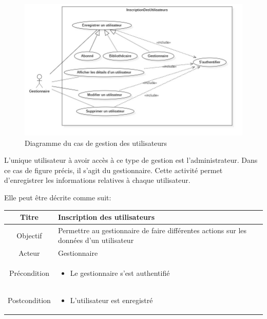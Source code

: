 \paragraph{}
\begin{figure}[h]
        \centering
        \includegraphics[width=1\textwidth]{gestionDesUtilisateursUseCase}
        \caption{Diagramme du cas de gestion des utilisateurs}
        \label{image-gestionDesUtilisateursUseCase}
        \end{figure}
\par 
L'unique utilisateur à avoir accès à ce type de gestion est l'administrateur. Dans 
ce cas de figure précis, il s'agit du gestionnaire. Cette activité 
permet d'enregistrer les informations relatives à chaque utilisateur. \par 
Elle peut être décrite comme suit: \par 
\begin{tabular}{|c|p{7cm}|}
        \hline
        Titre & Inscription des utilisateurs \\
        \hline
        Objectif & Permettre au gestionnaire de faire différentes actions sur les données d'un utilisateur \\
        \hline
        Acteur & Gestionnaire \\
        \hline
        Précondition & \begin{itemize}
                \item Le gestionnaire s'est authentifié 
        \end{itemize} \\
        \hline
        Postcondition & \begin{itemize}
                \item L'utilisateur est enregistré 
        \end{itemize} \\
        \hline
\end{tabular}
